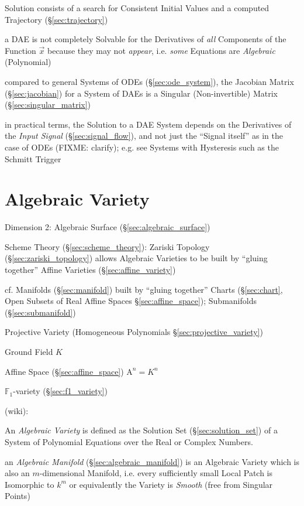 Solution consists of a search for Consistent Initial Values and a computed
Trajectory (\S\ref{sec:trajectory})

a DAE is not completely Solvable for the Derivatives of \emph{all} Components
of the Function $\vec{x}$ because they may not \emph{appear}, i.e. \emph{some}
Equations are \emph{Algebraic} (Polynomial)

compared to general Systems of ODEs (\S\ref{sec:ode_system}), the Jacobian
Matrix (\S\ref{sec:jacobian}) for a System of DAEs is a Singular
(Non-invertible) Matrix (\S\ref{sec:singular_matrix})

in practical terms, the Solution to a DAE System depends on the Derivatives of
the \emph{Input Signal} (\S\ref{sec:signal_flow}), and not just the ``Signal
itself'' as in the case of ODEs
(FIXME: clarify); e.g. see Systems with Hysteresis such as the Schmitt Trigger



\section{Algebraic Variety}\label{sec:algebraic_variety}

Dimension 2: Algebraic Surface (\S\ref{sec:algebraic_surface})

Scheme Theory (\S\ref{sec:scheme_theory}): Zariski Topology
(\S\ref{sec:zariski_topology}) allows Algebraic Varieties to be built by
``gluing together'' Affine Varieties (\S\ref{sec:affine_variety})

cf. Manifolds (\S\ref{sec:manifold}) built by ``gluing together'' Charts
(\S\ref{sec:chart}, Open Subsets of Real Affine Spaces
\S\ref{sec:affine_space}); Submanifolds (\S\ref{sec:submanifold})

\fist Projective Variety (Homogeneous Polynomials
\S\ref{sec:projective_variety})

Ground Field $K$

Affine Space (\S\ref{sec:affine_space}) $\mathrm{A}^n = K^n$

\fist $\mathbb{F}_1$-variety (\S\ref{sec:f1_variety})


(wiki):

An \emph{Algebraic Variety} is defined as the Solution Set
(\S\ref{sec:solution_set}) of a System of Polynomial Equations over the Real or
Complex Numbers.

\fist an \emph{Algebraic Manifold} (\S\ref{sec:algebraic_manifold}) is an
Algebraic Variety which is also an $m$-dimensional Manifold, i.e. every
sufficiently small Local Patch is Isomorphic to $k^m$ or equivalently the
Variety is \emph{Smooth} (free from Singular Points)

